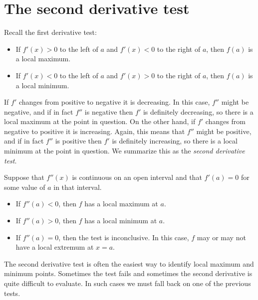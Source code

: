 \documentclass{ximera}
\begin{document}
\section{The second derivative test}


Recall the first derivative test:
\begin{itemize}
\item If $f'(x)>0$ to the left of $a$ and $f'(x)<0$ to the right of
  $a$, then $f(a)$ is a local maximum.
\item If $f'(x)<0$ to the left of $a$ and $f'(x)>0$ to the right of
  $a$, then $f(a)$ is a local minimum.
\end{itemize}

If $f'$ changes from positive to negative it is decreasing. In this
case, $f''$ might be negative, and if in fact $f''$ is negative
then $f'$ is definitely decreasing, so there is a local maximum at
the point in question. On the other hand, if $f'$ changes from
negative to positive it is increasing. Again, this means that
$f''$ might be positive, and if in fact $f''$ is positive then
$f'$ is definitely increasing, so there is a local minimum at the
point in question. We summarize this as the \textit{second derivative
  test}.

\begin{theorem}\label{T:sdt}
Suppose that $f''(x)$ is continuous on an open interval and that
$f'(a)=0$ for some value of $a$ in that interval.
\begin{itemize}
\item If $f''(a) <0$, then $f$ has a local maximum at $a$.
\item If $f''(a) >0$, then $f$ has a local minimum at $a$.
\item If $f''(a) =0$, then the test is inconclusive. In this case,
  $f$ may or may not have a local extremum at $x=a$.
\end{itemize}
\end{theorem}


The second derivative test is often the easiest way to identify local
maximum and minimum points. Sometimes the test fails and sometimes
the second derivative is quite difficult to evaluate. In such cases we
must fall back on one of the previous tests.
\end{document}
